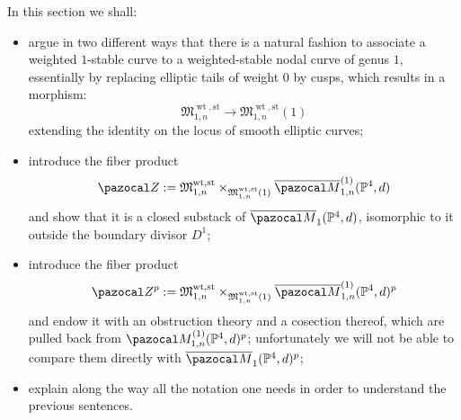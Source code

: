 \documentclass[11pt]{amsart}
\newcommand{\PP}{\mathbb P}
\renewcommand{\to}{\rightarrow}
\newcommand{\Z}{\pazocal Z}
\newcommand{\Zp}{\pazocal Z^p}
\newcommand{\oM}{\overline{\pazocal M}}
\theoremstyle{plain}
\theoremstyle{definition}
\begin{document}
In this section we shall:
\begin{itemize}
 \item argue in two different ways that there is a natural fashion to associate a weighted $1$-stable curve to a weighted-stable nodal curve of genus $1$, essentially by replacing elliptic tails of weight $0$ by cusps, which results in a morphism:
 \[\mathfrak M_{1,n}^{\operatorname{wt},\text{st}}\to\mathfrak M_{1,n}^{\operatorname{wt},\text{st}}(1)\]
extending the identity on the locus of smooth elliptic curves;
 \item introduce the fiber product 
 \[\Z:= \mathfrak M_{1,n}^{\operatorname{wt},\text{st}}\times_{\mathfrak M_{1,n}^{\operatorname{wt},\text{st}}(1)} \oM^{(1)}_{1,n}(\PP^4,d)\]
 and show that it is a closed substack of $\oM_1(\PP^4,d)$, isomorphic to it outside the boundary divisor $D^1$;
 \item introduce the fiber product \[\Zp:=\mathfrak M_{1,n}^{\operatorname{wt},\text{st}}\times_{\mathfrak M_{1,n}^{\operatorname{wt},\text{st}}(1)} \oM^{(1)}_{1,n}(\PP^4,d)^p \]
 and endow it with an obstruction theory and a cosection thereof, which are pulled back from  $\pazocal M^{(1)}_{1,n}(\PP^4,d)^p$; unfortunately we will not be able to compare them directly with $\oM_1(\PP^4,d)^p$;
 \item explain along the way all the notation one needs in order to understand the previous sentences.
\end{itemize}
\end{document}
